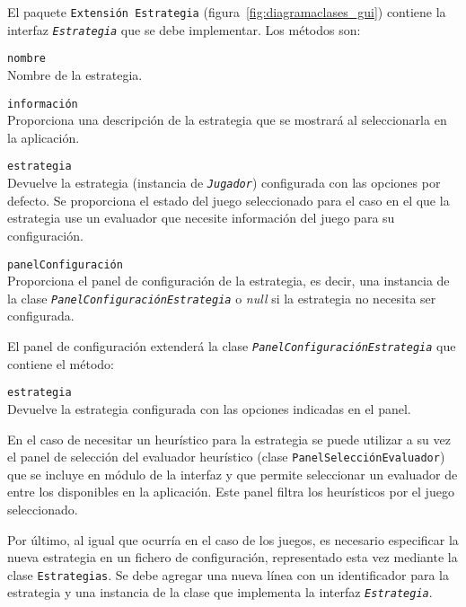 El paquete \texttt{Extensión Estrategia} (figura~\ref{fig:diagramaclases_gui}) contiene la interfaz \texttt{\textit{Estrategia}} que se debe implementar.
Los métodos son:
\begin{description}
	\item \texttt{nombre} \\
	Nombre de la estrategia.
	\item \texttt{información} \\
	Proporciona una descripción de la estrategia que se mostrará al seleccionarla en la aplicación.
	\item \texttt{estrategia} \\
	Devuelve la estrategia (instancia de \texttt{\textit{Jugador}}) configurada con las opciones por defecto. Se proporciona el estado del juego seleccionado para el caso en el que la estrategia use un evaluador que necesite información del juego para su configuración.
	\item \texttt{panelConfiguración} \\
	Proporciona el panel de configuración de la estrategia, es decir, una instancia de la clase \texttt{\textit{PanelConfiguraciónEstrategia}} o \textit{null} si la estrategia no necesita ser configurada.
\end{description}

El panel de configuración extenderá la clase \texttt{\textit{PanelConfiguraciónEstrategia}} que contiene el método:

\begin{description}
	\item \texttt{estrategia} \\
	Devuelve la estrategia configurada con las opciones indicadas en el panel.
\end{description}

En el caso de necesitar un heurístico para la estrategia se puede utilizar a su vez el panel de selección del evaluador heurístico (clase \texttt{PanelSelecciónEvaluador}) que se incluye en módulo de la interfaz y que permite seleccionar un evaluador de entre los disponibles en la aplicación. Este panel filtra los heurísticos por el juego seleccionado.

\bigskip
Por último, al igual que ocurría en el caso de los juegos, es necesario especificar la nueva estrategia en un fichero de configuración, representado esta vez mediante la clase \texttt{Estrategias}.
Se debe agregar una nueva línea con un identificador para la estrategia y una instancia de la clase que implementa la interfaz \texttt{\textit{Estrategia}}.


